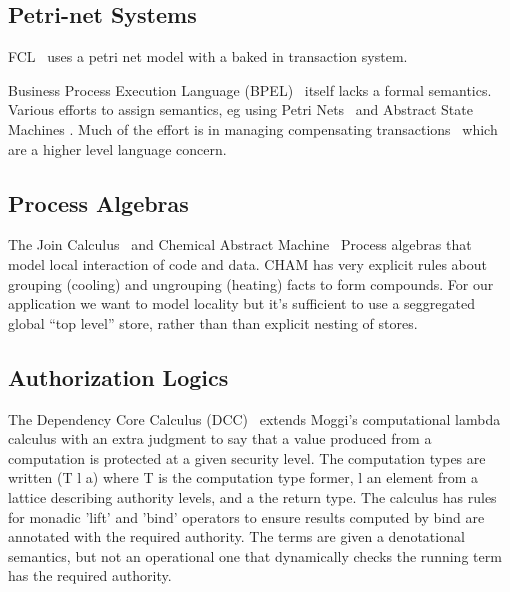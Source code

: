 \subsection{Petri-net Systems}
FCL~\cite{Adjoint2019:FCL} uses a petri net model with a baked in transaction system.

Business Process Execution Language (BPEL)~\cite{Andrews2003:BPEL} itself lacks a formal semantics. Various efforts to assign semantics, eg using Petri Nets~\cite{Lohmann2009:PetriBPEL} and Abstract State Machines \cite{Fahland2005:SemanticsBPEL}. Much of the effort is in managing compensating transactions~\cite{Colombo2011:Compensating} which are a higher level language concern.


\subsection{Process Algebras}
The Join Calculus~\cite{Cedric1996:Reflexive} and Chemical Abstract Machine~\cite{Berry1992:Chemical} Process algebras that model local interaction of code and data. CHAM has very explicit rules about grouping (cooling) and ungrouping (heating) facts to form compounds. For our application we want to model locality but it's sufficient to use a seggregated global ``top level'' store, rather than than explicit nesting of stores.


\subsection{Authorization Logics}

The Dependency Core Calculus (DCC)~\cite{Abadi1999:DCC} extends Moggi's computational lambda calculus with an extra judgment to say that a value produced from a computation is protected at a given security level. The computation types are written (T l a) where T is the computation type former, l an element from a lattice describing authority levels, and a the return type. The calculus has rules for monadic 'lift' and 'bind' operators to ensure results computed by bind are annotated with the required authority. The terms are given a denotational semantics, but not an operational one that dynamically checks the running term has the required authority.

